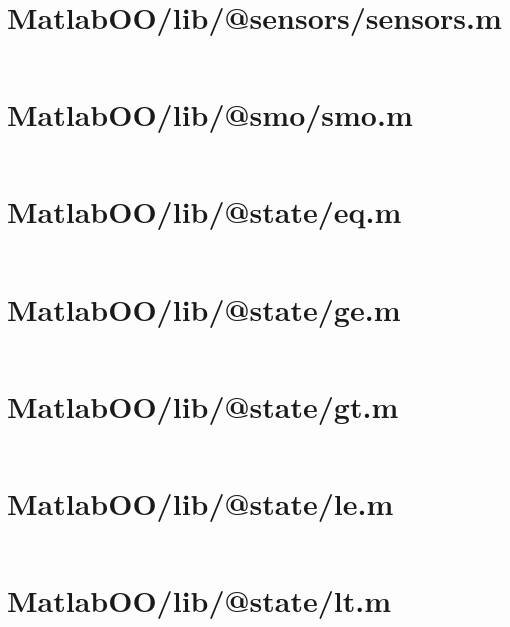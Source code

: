 \pagebreak
\section{MatlabOO/lib/@sensors/sensors.m}\label{code:MatlabOO/lib/@sensors/sensors.m}
\inputminted[linenos,fontsize=\scriptsize]{matlab}{/home/dcouture/git/mathyourlife/TSatPy/beta_versions/matlab_object_oriented/lib/@sensors/sensors.m}

\pagebreak
\section{MatlabOO/lib/@smo/smo.m}\label{code:MatlabOO/lib/@smo/smo.m}
\inputminted[linenos,fontsize=\scriptsize]{matlab}{/home/dcouture/git/mathyourlife/TSatPy/beta_versions/matlab_object_oriented/lib/@smo/smo.m}

\pagebreak
\section{MatlabOO/lib/@state/eq.m}\label{code:MatlabOO/lib/@state/eq.m}
\inputminted[linenos,fontsize=\scriptsize]{matlab}{/home/dcouture/git/mathyourlife/TSatPy/beta_versions/matlab_object_oriented/lib/@state/eq.m}

\pagebreak
\section{MatlabOO/lib/@state/ge.m}\label{code:MatlabOO/lib/@state/ge.m}
\inputminted[linenos,fontsize=\scriptsize]{matlab}{/home/dcouture/git/mathyourlife/TSatPy/beta_versions/matlab_object_oriented/lib/@state/ge.m}

\pagebreak
\section{MatlabOO/lib/@state/gt.m}\label{code:MatlabOO/lib/@state/gt.m}
\inputminted[linenos,fontsize=\scriptsize]{matlab}{/home/dcouture/git/mathyourlife/TSatPy/beta_versions/matlab_object_oriented/lib/@state/gt.m}

\pagebreak
\section{MatlabOO/lib/@state/le.m}\label{code:MatlabOO/lib/@state/le.m}
\inputminted[linenos,fontsize=\scriptsize]{matlab}{/home/dcouture/git/mathyourlife/TSatPy/beta_versions/matlab_object_oriented/lib/@state/le.m}

\pagebreak
\section{MatlabOO/lib/@state/lt.m}\label{code:MatlabOO/lib/@state/lt.m}
\inputminted[linenos,fontsize=\scriptsize]{matlab}{/home/dcouture/git/mathyourlife/TSatPy/beta_versions/matlab_object_oriented/lib/@state/lt.m}

